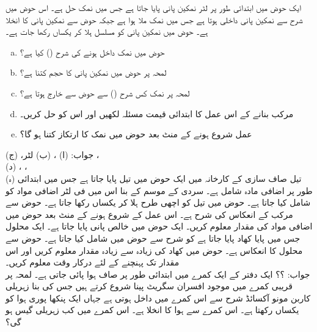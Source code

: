 ایک حوض میں ابتدائی طور پر  لٹر نمکین پانی پایا جاتا ہے جس میں  نمک حل ہے۔ اس حوض میں  شرح سے نمکین پانی داخلی ہوتا ہے جس میں  نمک ملا ہوا ہے جبکہ حوض سے نمکین پانی کا انخلا  ہے۔ حوض میں نمکین پانی کو مسلسل ہلا کر یکساں رکھا جات ہے۔
\begin{enumerate}[a.]
\item
حوض میں نمک داخل ہونے کی شرح () کیا ہے؟
\item
لمحہ  پر حوض میں نمکین پانی کا حجم کتنا ہے؟
\item
لمحہ  پر نمک کس شرح () سے حوض سے خارج ہوتا ہے؟
\item
 مرکب بنانے کے اس عمل کا ابتدائی قیمت مسئلہ لکھیں اور اس کو حل کریں۔
\item
عمل شروع ہونے کے  منٹ بعد حوض میں نمک کا ارتکاز کتنا ہو گا؟ 
\end{enumerate}
جواب:\quad
(ا) ، (ب)  لٹر، (ج) ،\\ (د) ، ،\\
(ہ) 
تیل صاف سازی کے کارخانہ میں ایک حوض میں  تیل پایا جاتا ہے جس میں ابتدائی طور پر  اضافی مادہ شامل ہے۔ سردی کے موسم کے بنا اس میں  فی لٹر اضافی مواد کو   شامل کیا جاتا ہے۔ حوض میں تیل کو اچھی طرح ہلا کر یکساں رکھا جاتا ہے۔ حوض سے مرکب کے انعکاس  کی شرح  ہے۔ اس عمل کے شروع ہونے کے  منٹ بعد حوض میں اضافی مواد کی مقدار معلوم کریں۔
ایک حوض میں  خالص پانی پایا جاتا ہے۔ ایک محلول جس میں  پایا کھاد پایا جاتا ہے کو  شرح سے حوض میں شامل کیا جاتا ہے۔ حوض سے محلول کا انعکاس  ہے۔ حوض میں کھاد کی زیادہ سے زیادہ مقدار معلوم کریں اور اس مقدار تک پہنچنے کے لئے درکار وقت معلوم کریں۔\\
جواب:\quad
؟؟  
ایک دفتر کے ایک کمرے میں ابتدائی طور پر  صاف ہوا پائی جاتی ہے۔ لمحہ  پر قریبی کمرے  میں موجود افسران سگریٹ پینا شروع کرتے ہیں جس کی بنا  زہریلی کاربن مونو آکسائڈ  شرح سے اس کمرے  میں داخل ہوتی ہے جہاں ایک پنکھا پوری ہوا کو یکساں رکھتا ہے۔ اس کمرے سے ہوا کا انخلا  ہے۔ اس کمرے میں کب زہریلی گیس  ہو گی؟
